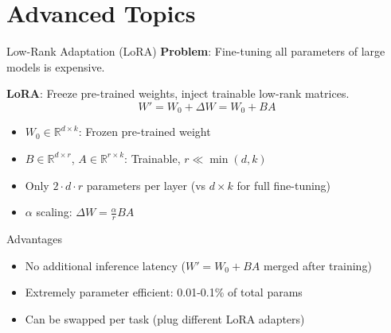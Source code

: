 \documentclass[11pt]{beamer}
\begin{document}
\section{Advanced Topics}

\begin{frame}{Low-Rank Adaptation (LoRA)}
    \textbf{Problem}: Fine-tuning all parameters of large models is expensive.
    \vspace{0.5em}

    \textbf{LoRA}: Freeze pre-trained weights, inject trainable low-rank matrices.
    \[
        W' = W_0 + \Delta W = W_0 + BA
    \]
    \begin{itemize}
        \item $W_0 \in \mathbb{R}^{d \times k}$: Frozen pre-trained weight
        \item $B \in \mathbb{R}^{d \times r}$, $A \in \mathbb{R}^{r \times k}$: Trainable, $r \ll \min(d,k)$
        \item Only $2 \cdot d \cdot r$ parameters per layer (vs $d \times k$ for full fine-tuning)
        \item $\alpha$ scaling: $\Delta W = \frac{\alpha}{r} BA$
    \end{itemize}
    \vfill
    \begin{block}{Advantages}
        \begin{itemize}
            \item No additional inference latency ($W' = W_0 + BA$ merged after training)
            \item Extremely parameter efficient: 0.01-0.1\% of total params
            \item Can be swapped per task (plug different LoRA adapters)
        \end{itemize}
    \end{block}
\end{frame}
\end{document}

